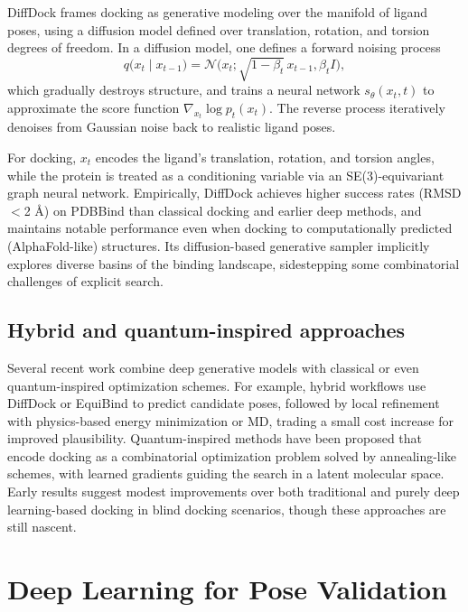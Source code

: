 \documentclass[12pt]{article}
\begin{document}
DiffDock frames docking as generative modeling over the manifold of ligand poses, using a diffusion model defined over translation, rotation, and torsion degrees of freedom.\cite{CH13_corso2022diffdock,CH13_suriana2023enhancing} In a diffusion model, one defines a forward noising process
\[
q\big(x_t \mid x_{t-1}\big) = \mathcal{N}\big(x_t; \sqrt{1 - \beta_t}\,x_{t-1}, \beta_t I\big),
\]
which gradually destroys structure, and trains a neural network $s_{\theta}(x_t, t)$ to approximate the score function $\nabla_{x_t} \log p_t(x_t)$. The reverse process iteratively denoises from Gaussian noise back to realistic ligand poses. 

For docking, $x_t$ encodes the ligand’s translation, rotation, and torsion angles, while the protein is treated as a conditioning variable via an SE(3)-equivariant graph neural network.\cite{CH13_corso2022diffdock} Empirically, DiffDock achieves higher success rates (RMSD $<$2 \r{A}) on PDBBind than classical docking and earlier deep methods, and maintains notable performance even when docking to computationally predicted (AlphaFold-like) structures.\cite{CH13_corso2022diffdock, CH13_suriana2023enhancing} Its diffusion-based generative sampler implicitly explores diverse basins of the binding landscape, sidestepping some combinatorial challenges of explicit search.

\subsection{Hybrid and quantum-inspired approaches}

Several recent work combine deep generative models with classical or even quantum-inspired optimization schemes. For example, hybrid workflows use DiffDock or EquiBind to predict candidate poses, followed by local refinement with physics-based energy minimization or MD, trading a small cost increase for improved plausibility.\cite{CH13_posebusters2023,CH13_compassdock2024} Quantum-inspired methods have been proposed that encode docking as a combinatorial optimization problem solved by annealing-like schemes, with learned gradients guiding the search in a latent molecular space.\cite{CH13_quantuminspired2024} Early results suggest modest improvements over both traditional and purely deep learning-based docking in blind docking scenarios, though these approaches are still nascent.\cite{CH13_quantuminspired2024}

\section{Deep Learning for Pose Validation}
\end{document}
